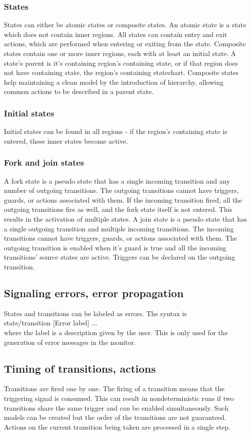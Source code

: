 {    \subsubsection{States}
States can either be atomic states or composite states. An atomic state is a state which does not contain inner regions. All states can contain entry and exit actions, which are performed when entering or exiting from the state. Composite states contain one or more inner regions, each with at least an initial state. A state's parent is it's containing region's containing state, or if that region does not have containing state, the region's containing statechart. Composite states help maintaining a clean model by the introduction of hierarchy, allowing common actions to be described in a parent state.
    \subsubsection{Initial states}
Initial states can be found in all regions - if the region's containing state is entered, these inner states become active.
    \subsubsection{Fork and join states}
A fork state is a pseudo state that has a single incoming transition and any number of outgoing transitions. The outgoing transitions cannot have triggers, guards, or actions associated with them. If the incoming transition fired, all the outgoing transitions fire as well, and the fork state itself is not entered. This results in the activation of multiple states.
A join state is a pseudo state that has a single outgoing transition and multiple incoming transitions. The incoming transitions cannot have triggers, guards, or actions associated with them. The outgoing transition is enabled when it's guard is true and all the incoming transitions' source states are active. Triggers can be declared on the outgoing transition.
  \subsection{Signaling errors, error propagation}
States and transitions can be labeled as errors. The syntax is \\state/transition [Error label] ...\\ where the label is a description given by the user. This is only used for the generation of error messages in the monitor.
  \subsection{Timing of transitions, actions}
Transitions are fired one by one. The firing of a transition means that the triggering signal is consumed. This can result in nondeterministic runs if two transitions share the same trigger and can be enabled simultaneously. Such models can be created but the order of the transitions are not guaranteed. Actions on the current transition being taken are processed in a single step.
}
